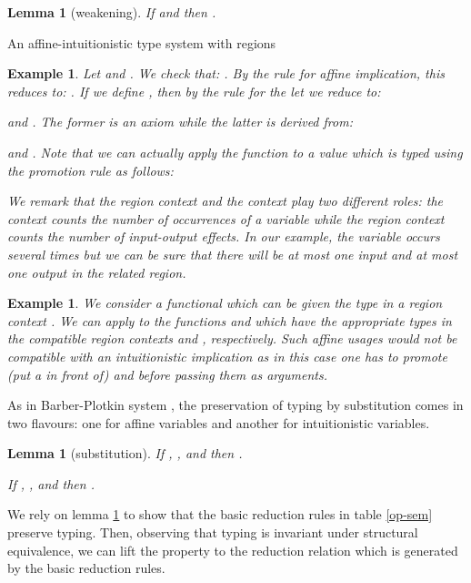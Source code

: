 \documentclass[11pt]{article}
\newcommand{\Defitem}[1]{\smallskip \noindent }
\newcommand{\Defitemf}[1]{\noindent }
\newtheorem{lemma}[theorem]{Lemma}
\newtheorem{example}[theorem]{Example}
\begin{document}
\begin{lemma}[weakening]
If  and  then
.
\end{lemma}



\begin{table}
{\footnotesize
}
\caption{An affine-intuitionistic type system with regions}\label{air-system}
\end{table}


\begin{example}
Let  and 
.
We check that: .
By the rule for affine implication, this reduces to:
.
If we define , then by the rule for the
{\sf let} we reduce to:

and 
.
The former is an axiom while the latter is derived from:
 
and
.
Note that we can actually apply the function  to a value  which 
is typed using the promotion rule as follows:

We remark that the region context and the context play two
different roles: the context counts the number of occurrences of a variable
while the region context counts the number of input-output effects. 
In our example, the variable  occurs several times but we can be sure
that there will be at most one input and at most one output in the related
region.
\end{example}

\begin{example}
We consider a {\em functional} 
which can be given the type 
 in a region
context . We can apply  to 
the functions  and  which
have the appropriate types in the compatible region contexts 
 and 
, respectively.
Such {\em affine} usages would not be compatible with an
intuitionistic implication as in this case
one has to {\em promote} (put a  in front of) 
 and  before passing them as arguments.
\end{example}


As in Barber-Plotkin system \cite{Barber96}, the preservation of typing by
substitution comes in two flavours: one for affine variables and another
for intuitionistic variables.

\begin{lemma}[substitution]\label{sub-lemma}
\Defitemf{(1)} If ,
, and 
 then
.

\Defitem{(2)} If ,
, and 
 then
.
\end{lemma}

We rely on lemma \ref{sub-lemma} to show that the basic
reduction rules in table \ref{op-sem} preserve typing.
Then, observing that typing is invariant under structural
equivalence, we can lift the property  to the reduction relation 
which is generated by the basic reduction rules.
\end{document}
